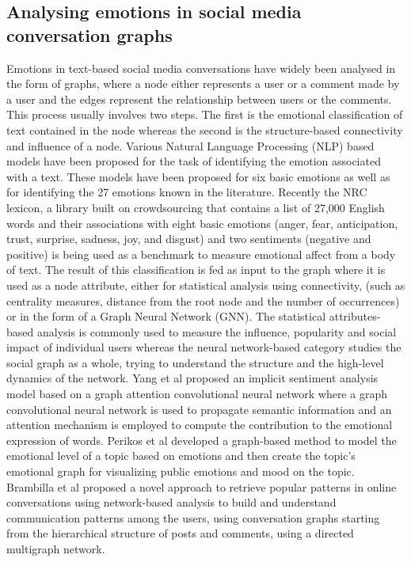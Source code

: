 \documentclass[acmtog]{acmart}
\begin{document}
\subsection{Analysing emotions in social media conversation graphs}
Emotions in text-based social media conversations have widely been analysed in the form of graphs, where a node either represents a user or a comment made by a user and the edges represent the relationship between users or the comments. This process usually involves two steps. The first is the emotional classification of text contained in the node whereas the second is the structure-based connectivity and influence of a node. Various Natural Language Processing (NLP) based models have been proposed for the task of identifying the emotion associated with a text. These models have been proposed for six basic emotions as well as for identifying the 27 emotions known in the literature. Recently the NRC lexicon, a library built on crowdsourcing that contains a list of 27,000 English words and their associations with eight basic emotions (anger, fear, anticipation, trust, surprise, sadness, joy, and disgust) and two sentiments (negative and positive) is being used as a benchmark to measure emotional affect from a body of text. 
The result of this classification is fed as input to the graph where it is used as a node attribute, either for statistical analysis using connectivity, (such as centrality measures, distance from the root node and the number of occurrences) or in the form of a Graph Neural Network (GNN). The statistical attributes-based analysis is commonly used to measure the influence, popularity and social impact of individual users whereas the neural network-based category studies the social graph as a whole, trying to understand the structure and the high-level dynamics of the network. Yang et al proposed an implicit sentiment analysis model based on a graph attention convolutional neural network where a graph convolutional neural network is used to propagate semantic information and an attention mechanism is employed to compute the contribution to the emotional expression of words. Perikos et al developed a graph-based method to model the emotional level of a topic based on emotions and then create the topic’s emotional graph for visualizing public emotions and mood on the topic. Brambilla et al proposed a novel approach to retrieve popular patterns in online conversations using network-based analysis to build and understand communication patterns among the users, using conversation graphs starting from the hierarchical structure of posts and comments, using a directed multigraph network.
\end{document}
